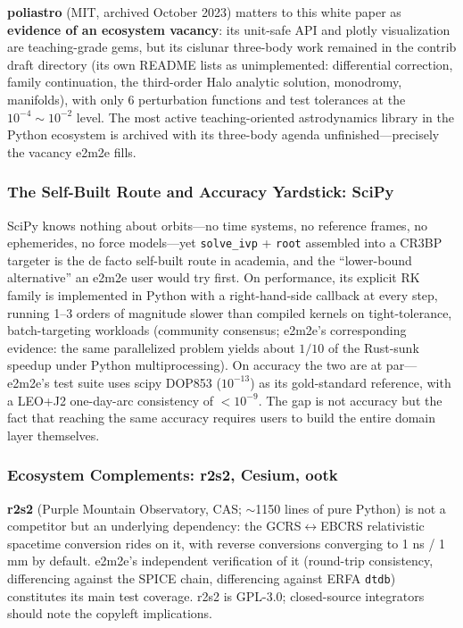 \textbf{poliastro} (MIT, archived October 2023) matters to this white paper
as \textbf{evidence of an ecosystem vacancy}: its unit-safe API and plotly
visualization are teaching-grade gems, but its cislunar three-body work
remained in the contrib draft directory (its own README lists as unimplemented:
differential correction, family continuation, the third-order Halo analytic
solution, monodromy, manifolds), with only 6 perturbation functions and test
tolerances at the $10^{-4}\sim10^{-2}$ level. The most active
teaching-oriented astrodynamics library in the Python ecosystem is archived
with its three-body agenda unfinished---precisely the vacancy e2m2e fills.

\subsubsection{The Self-Built Route and Accuracy Yardstick: SciPy}

SciPy knows nothing about orbits---no time systems, no reference frames, no
ephemerides, no force models---yet \texttt{solve\_ivp} + \texttt{root}
assembled into a CR3BP targeter is the de facto self-built route in academia,
and the ``lower-bound alternative'' an e2m2e user would try first. On
performance, its explicit RK family is implemented in Python with a
right-hand-side callback at every step, running 1--3 orders of magnitude
slower than compiled kernels on tight-tolerance, batch-targeting workloads
(community consensus; e2m2e's corresponding evidence: the same parallelized
problem yields about $1/10$ of the Rust-sunk speedup under Python
multiprocessing). On accuracy the two are at par---e2m2e's test suite uses
scipy DOP853 ($10^{-13}$) as its gold-standard reference, with a
LEO+J2 one-day-arc consistency of $<10^{-9}$. The gap is not accuracy but
the fact that reaching the same accuracy requires users to build the entire
domain layer themselves.

\subsubsection{Ecosystem Complements: r2s2, Cesium, ootk}

\textbf{r2s2} (Purple Mountain Observatory, CAS; $\sim$1150 lines of pure
Python) is not a competitor but an underlying dependency: the
GCRS$\leftrightarrow$EBCRS relativistic spacetime conversion rides on it,
with reverse conversions converging to 1 ns / 1 mm by default. e2m2e's
independent verification of it (round-trip consistency, differencing against
the SPICE chain, differencing against ERFA \texttt{dtdb}) constitutes its
main test coverage. r2s2 is GPL-3.0; closed-source integrators should note
the copyleft implications.

